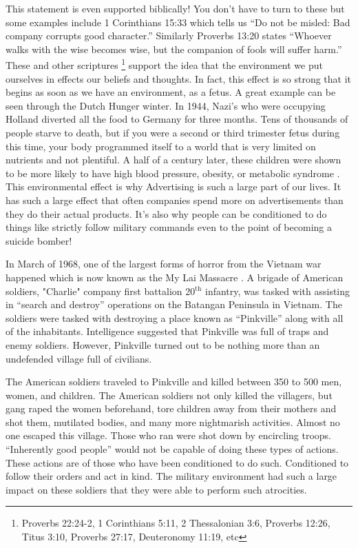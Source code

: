 \documentclass[11pt]{article}
\begin{document}
\begin{multicols}{2}
This statement is even supported biblically! You don't have to turn to these but some examples include 1 Corinthians 15:33 which tells us ``Do not be misled: Bad company corrupts good character.'' Similarly Proverbs 13:20 states ``Whoever walks with the wise becomes wise, but the companion of fools will suffer harm.'' These and other scriptures \footnote{Proverbs 22:24-2, 1 Corinthians 5:11, 2 Thessalonian 3:6, Proverbs 12:26, Titus 3:10, Proverbs 27:17, Deuteronomy 11:19, etc} support the idea that the environment we put ourselves in effects our beliefs and thoughts. In fact, this effect is so strong that it begins as soon as we have an environment, as a fetus. A great example can be seen through the Dutch Hunger winter. In 1944, Nazi's who were occupying Holland diverted all the food to Germany for three months. Tens of thousands of people starve to death, but if you were a second or third trimester fetus during this time, your body programmed itself to a world that is very limited on nutrients and not plentiful. A half of a century later, these children were shown to be more likely to have high blood pressure, obesity, or metabolic syndrome \cite{It's genetic part 2}. This environmental effect is why Advertising is such a large part of our lives. It has such a large effect that often companies spend more on advertisements than they do their actual products. It's also why people can be conditioned to do things like strictly follow military commands even to the point of becoming a suicide bomber!

In March of 1968, one of the largest forms of horror from the Vietnam war happened which is now known as the My Lai Massacre \cite{My Lai Massacre, Robert Sapolsky}. A brigade of American soldiers, "Charlie" company first battalion 20$^\textrm{th}$ infantry, was tasked with assisting in ``search and destroy'' operations on the Batangan Peninsula in Vietnam. The soldiers were tasked with destroying a place known as ``Pinkville'' along with all of the inhabitants. Intelligence suggested that Pinkville was full of traps and enemy soldiers. However, Pinkville turned out to be nothing more than an undefended village full of civilians. 

The American soldiers traveled to Pinkville and killed between 350 to 500 men, women, and children. The American soldiers not only killed the villagers, but gang raped the women beforehand, tore children away from their mothers and shot them, mutilated bodies, and many more nightmarish activities. Almost no one escaped this village. Those who ran were shot down by encircling troops. ``Inherently good people'' would not be capable of doing these types of actions. These actions are of those who have been conditioned to do such. Conditioned to follow their orders and act in kind. The military environment had such a large impact on these soldiers that they were able to perform such atrocities.


\end{multicols}
\end{document}
